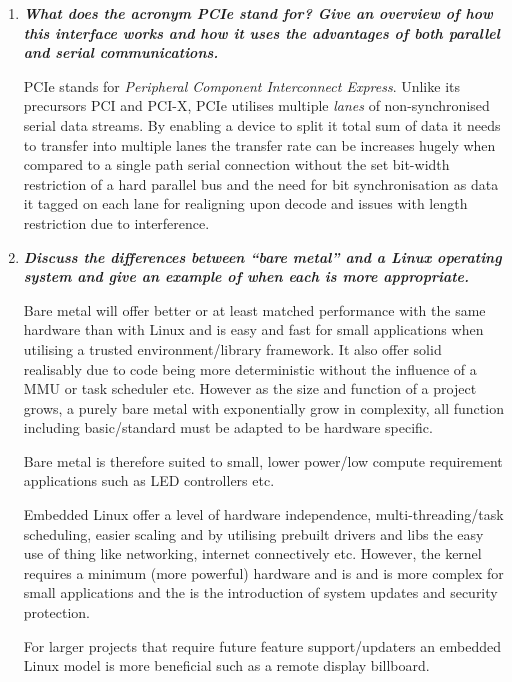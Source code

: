 \documentclass[11pt]{article}
\begin{document}
\begin{enumerate}
    \item \textit{\textbf{What does the acronym PCIe stand for? Give an overview of how this interface works and how it uses the advantages of both parallel and serial communications.}}
    
    PCIe stands for \textit{Peripheral Component Interconnect Express}. Unlike its precursors PCI and PCI-X, PCIe utilises multiple \textit{lanes} of non-synchronised serial data streams. By enabling a device to split it total sum of data it needs to transfer into multiple lanes the transfer rate can be increases hugely when compared to a single path serial connection without the set bit-width restriction of a hard parallel bus and the need for bit synchronisation as data it tagged on each lane for realigning upon decode and issues with length restriction due to interference.
    
    \item \textit{\textbf{Discuss the differences between “bare metal” and a Linux operating system and give an example of when each is more appropriate.}}

    Bare metal will offer better or at least matched performance with the same hardware than with Linux and is easy and fast for small applications when utilising a trusted environment/library framework. It also offer solid realisably due to code being more deterministic without the influence of a MMU or task scheduler etc. However as the size and function of a project grows, a purely bare metal with exponentially grow in complexity, all function including basic/standard must be adapted to be hardware specific.
    
    Bare metal is therefore suited to small, lower power/low compute requirement applications such as LED controllers etc.

    Embedded Linux offer a level of hardware independence, multi-threading/task scheduling, easier scaling and by utilising prebuilt drivers and libs the easy use of thing like networking, internet connectively etc. However, the kernel requires a minimum (more powerful) hardware and is and is more complex for small applications and the is the introduction of system updates and security protection.

    For larger projects that require future feature support/updaters an embedded Linux model is more beneficial such as a remote display billboard.

\end{enumerate}
\end{document}
